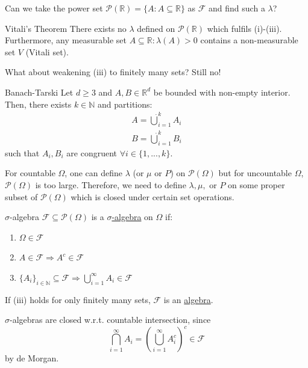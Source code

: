 \documentclass{article}
\begin{document}
	Can we take the power set $\mathcal{P}(\mathbb{R})=\{A : A\subseteq \mathbb{R}\}$ as $\mathcal{F}$ and find such a $\lambda$?
	
	\begin{mythm}{Vitali's Theorem}{}
		There exists no $\lambda$ defined on $\mathcal{P}(\mathbb{R})$ which fulfils (i)-(iii). Furthermore, any measurable set $A\subseteq\mathbb{R}: \lambda(A)>0$ contains a non-measurable set $V$ (Vitali set). 
	\end{mythm}
	
	What about weakening (iii) to finitely many sets? Still no!
	
	\begin{mythm}{Banach-Tarski}{}
		Let $d\geq 3$ and $A, B\in \mathbb{R}^d$ be bounded with non-empty interior. Then, there exists $k\in\mathbb{N}$ and partitions:
		\begin{align*}
			A=\dot\bigcup_{i=1}^kA_i\\
			B=\dot\bigcup_{i=1}^kB_i
		\end{align*}
		such that $A_i, B_i$ are congruent $\forall i\in \{1,..., k\}$.
	\end{mythm}
	
	For countable $\Omega$, one can define $\lambda$ (or $\mu$ or $P$) on $\mathcal{P}(\Omega)$ but for uncountable $\Omega$, $\mathcal{P}(\Omega)$ is too large. Therefore, we need to define $\lambda, \mu,$ or  $P$ on some proper subset of $\mathcal{P}(\Omega)$ which is closed under certain set operations.
	
	\begin{mydef}{$\sigma$-algebra}{}
		$\mathcal{F}\subseteq\mathcal{P}(\Omega)$ is a \underline{$\sigma$-algebra} on $\Omega$ if:
		\begin{enumerate}[label=(\roman*)]
			\item $\Omega\in\mathcal{F}$
			\item $A\in\mathcal{F}\Rightarrow A^c\in\mathcal{F}$
			\item $\{A_i\}_{i\in\mathbb{N}}\subseteq\mathcal{F}\Rightarrow\bigcup_{i=1}^{\infty}A_i\in\mathcal{F}$
		\end{enumerate}
		If (iii) holds for only finitely many sets, $\mathcal{F}$ is an \underline{algebra}.
	\end{mydef}
	
	\begin{myrem}{}{}
		$\sigma$-algebras are closed w.r.t. countable intersection, since
		\begin{equation*}
			\bigcap_{i=1}^{\infty}A_i=(\bigcup_{i=1}^{\infty}A_i^c)^c\in\mathcal{F}
		\end{equation*}
		by de Morgan.
	\end{myrem}
	
\end{document}
